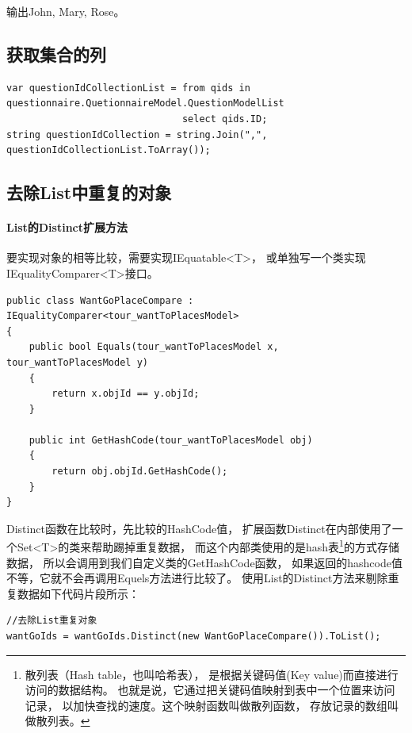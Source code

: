 \documentclass{book}
\begin{document}
输出John, Mary, Rose。

\subsection{获取集合的列}

\begin{lstlisting}[language={[Sharp]C}]
var questionIdCollectionList = from qids in questionnaire.QuetionnaireModel.QuestionModelList
                               select qids.ID;
string questionIdCollection = string.Join(",", questionIdCollectionList.ToArray());
\end{lstlisting}

\subsection{去除List中重复的对象}

\paragraph{List的Distinct扩展方法}要实现对象的相等比较，需要实现IEquatable<T>，
或单独写一个类实现IEqualityComparer<T>接口。

\begin{lstlisting}[language={[Sharp]C}]
public class WantGoPlaceCompare : IEqualityComparer<tour_wantToPlacesModel>
{
    public bool Equals(tour_wantToPlacesModel x, tour_wantToPlacesModel y)
    {
        return x.objId == y.objId;
    }

    public int GetHashCode(tour_wantToPlacesModel obj)
    {
        return obj.objId.GetHashCode();
    }
}
\end{lstlisting}

Distinct函数在比较时，先比较的HashCode值，
扩展函数Distinct在内部使用了一个Set<T>的类来帮助踢掉重复数据，
而这个内部类使用的是hash表\footnote{散列表（Hash table，也叫哈希表），
是根据关键码值(Key value)而直接进行访问的数据结构。
也就是说，它通过把关键码值映射到表中一个位置来访问记录，
以加快查找的速度。这个映射函数叫做散列函数，
存放记录的数组叫做散列表。}的方式存储数据，
所以会调用到我们自定义类的GetHashCode函数，
如果返回的hashcode值不等，它就不会再调用Equels方法进行比较了。
使用List的Distinct方法来剔除重复数据如下代码片段所示：

\begin{lstlisting}[language={[Sharp]C}]
//去除List重复对象
wantGoIds = wantGoIds.Distinct(new WantGoPlaceCompare()).ToList();
\end{lstlisting}
\end{document}
